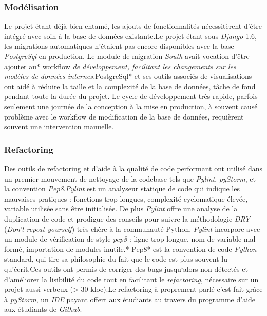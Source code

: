 \documentclass[french, 11pt]{memoir}
\begin{document}
\subsubsection{Modélisation}\label{moduxe9lisation}

Le projet étant déjà bien entamé, les ajouts de fonctionnalités
nécessitèrent d'être intégré avec soin à la base de données existante.Le
projet étant sous \emph{Django} 1.6, les migrations automatiques
n'étaient pas encore disponibles avec la base \emph{PostgreSql} en
production. Le module de migration \emph{South} avait vocation d'être
ajouter au* workflow \emph{de développement, facilitant les changements
	sur les modèles de données internes.}PostgreSql* et ses outils associés
de visualisations ont aidé à réduire la taille et la complexité de la
base de données, tâche de fond pendant toute la durée du projet. Le
cycle de développement très rapide, parfois seulement une journée de la
conception à la mise en production, à souvent causé problème avec le
workflow de modification de la base de données, requièrent souvent une
intervention manuelle.

\subsubsection{Refactoring}\label{refactoring-1}

Des outils de refactoring et d'aide à la qualité de code performant ont
utilisé dans un premier mouvement de nettoyage de la codebase tels que
\emph{Pylint}, \emph{pyStorm}, et la convention
\emph{Pep8}.\emph{Pylint} est un analyseur statique de code qui indique
les mauvaises pratiques : fonctions trop longues, complexité
cyclomatique élevée, variable utilisée sans être initialisée. De plus
\emph{Pylint} offre une analyse de la duplication de code et prodigue
des conseils pour suivre la méthodologie \emph{DRY} (\emph{Don't repeat
	yourself}) très chère à la communauté Python. \emph{Pylint} incorpore
avec un module de vérification de style \emph{pep8} : ligne trop longue,
nom de variable mal formé, importation de modules inutile.* Pep8* est la
convention de code \emph{Python} standard, qui tire sa philosophie du
fait que le code est plus souvent lu qu'écrit.Ces outils ont permis de
corriger des bugs jusqu`alors non détectés et d'améliorer la lisibilité
du code tout en facilitant le \emph{refactoring}, nécessaire sur un
projet aussi verbeux (\textgreater{} 30 kloc).Le refactoring à
proprement parlé c'est fait grâce à \emph{pyStorm}, un \emph{IDE} payant
offert aux étudiants au travers du programme d'aide aux étudiants de
\emph{Github}.
\end{document}
